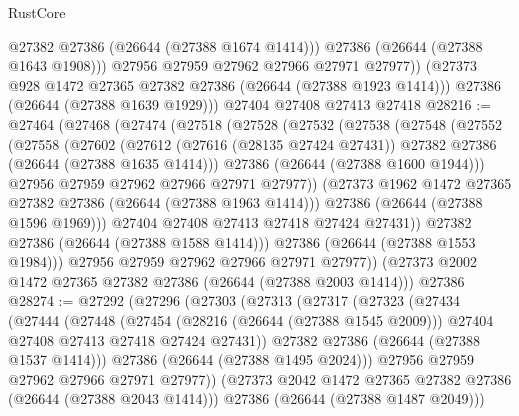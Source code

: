 \begin{lexlean}{RustCore}
\begin{coremodule}
              @27382
              @27386
              (@26644 (@27388 @1674 @1414)))
            @27386
            (@26644 (@27388 @1643 @1908)))
          @27956
          @27959
          @27962
          @27966
          @27971
          @27977))
      (@27373 @928 @1472 @27365 @27382 @27386 (@26644 (@27388 @1923 @1414)))
      @27386
      (@26644 (@27388 @1639 @1929)))
    @27404
    @27408
    @27413
    @27418
@28216 := @27464
    (@27468
      (@27474
        (@27518
          (@27528
            (@27532
              (@27538
                (@27548
                  (@27552
                    (@27558
                      (@27602
                        (@27612
                          (@27616 (@28135 @27424 @27431))
                          @27382
                          @27386
                          (@26644 (@27388 @1635 @1414)))
                        @27386
                        (@26644 (@27388 @1600 @1944)))
                      @27956
                      @27959
                      @27962
                      @27966
                      @27971
                      @27977))
                  (@27373 @1962 @1472 @27365 @27382 @27386 (@26644 (@27388 @1963 @1414)))
                  @27386
                  (@26644 (@27388 @1596 @1969)))
                @27404
                @27408
                @27413
                @27418
                @27424
                @27431))
            @27382
            @27386
            (@26644 (@27388 @1588 @1414)))
          @27386
          (@26644 (@27388 @1553 @1984)))
        @27956
        @27959
        @27962
        @27966
        @27971
        @27977))
    (@27373 @2002 @1472 @27365 @27382 @27386 (@26644 (@27388 @2003 @1414)))
    @27386
@28274 := @27292
    (@27296
      (@27303
        (@27313
          (@27317
            (@27323
              (@27434
                (@27444
                  (@27448
                    (@27454
                      (@28216 (@26644 (@27388 @1545 @2009)))
                      @27404
                      @27408
                      @27413
                      @27418
                      @27424
                      @27431))
                  @27382
                  @27386
                  (@26644 (@27388 @1537 @1414)))
                @27386
                (@26644 (@27388 @1495 @2024)))
              @27956
              @27959
              @27962
              @27966
              @27971
              @27977))
          (@27373 @2042 @1472 @27365 @27382 @27386 (@26644 (@27388 @2043 @1414)))
          @27386
          (@26644 (@27388 @1487 @2049)))

\end{coremodule}
\end{lexlean}
